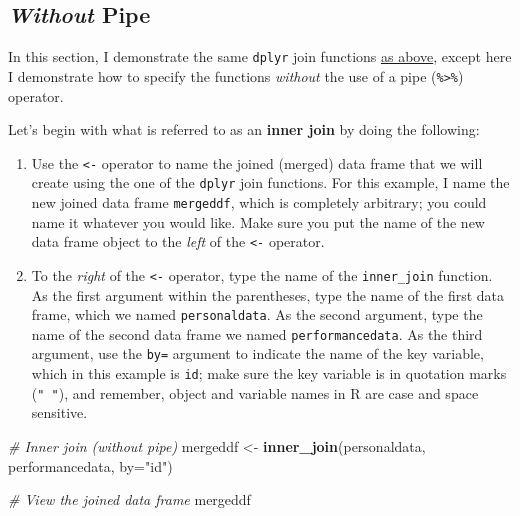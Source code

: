 \documentclass[]{book}
\newenvironment{Shaded}{\begin{snugshade}}{\end{snugshade}}
\newcommand{\KeywordTok}[1]{\textcolor[rgb]{0.13,0.29,0.53}{\textbf{#1}}}
\newcommand{\DataTypeTok}[1]{\textcolor[rgb]{0.13,0.29,0.53}{#1}}
\newcommand{\StringTok}[1]{\textcolor[rgb]{0.31,0.60,0.02}{#1}}
\newcommand{\CommentTok}[1]{\textcolor[rgb]{0.56,0.35,0.01}{\textit{#1}}}
\newcommand{\NormalTok}[1]{#1}
\providecommand{\tightlist}{%
  \setlength{\itemsep}{0pt}\setlength{\parskip}{0pt}}
\begin{document}
\hypertarget{opt2_join_withoutpipe}{\subsection{\texorpdfstring{\emph{Without}
Pipe}{Without Pipe}}\label{opt2_join_withoutpipe}}

In this section, I demonstrate the same \texttt{dplyr} join functions
\protect\hyperlink{opt2_join_withpipe}{as above}, except here I
demonstrate how to specify the functions \emph{without} the use of a
pipe (\texttt{\%\textgreater{}\%}) operator.

Let's begin with what is referred to as an \textbf{inner join} by doing
the following:

\begin{enumerate}
\def\labelenumi{\arabic{enumi}.}
\tightlist
\item
  Use the \texttt{\textless{}-} operator to name the joined (merged)
  data frame that we will create using the one of the \texttt{dplyr}
  join functions. For this example, I name the new joined data frame
  \texttt{mergeddf}, which is completely arbitrary; you could name it
  whatever you would like. Make sure you put the name of the new data
  frame object to the \emph{left} of the \texttt{\textless{}-} operator.
\item
  To the \emph{right} of the \texttt{\textless{}-} operator, type the
  name of the \texttt{inner\_join} function. As the first argument
  within the parentheses, type the name of the first data frame, which
  we named \texttt{personaldata}. As the second argument, type the name
  of the second data frame we named \texttt{performancedata}. As the
  third argument, use the \texttt{by=} argument to indicate the name of
  the key variable, which in this example is \texttt{id}; make sure the
  key variable is in quotation marks (\texttt{"\ "}), and remember,
  object and variable names in R are case and space sensitive.
\end{enumerate}

\begin{Shaded}
\begin{Highlighting}[]
\CommentTok{# Inner join (without pipe)}
\NormalTok{mergeddf <-}\StringTok{ }\KeywordTok{inner_join}\NormalTok{(personaldata, performancedata, }\DataTypeTok{by=}\StringTok{"id"}\NormalTok{)}

\CommentTok{# View the joined data frame}
\NormalTok{mergeddf}
\end{Highlighting}
\end{Shaded}
\end{document}
